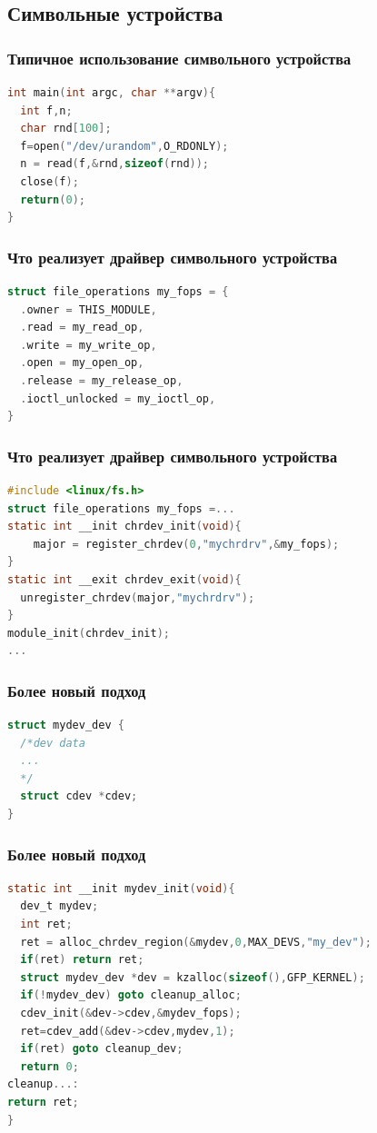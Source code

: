 \subsection{Символьные устройства}
\begin{frame}[fragile]
  \frametitle{Типичное использование символьного устройства}
\begin{lstlisting}[language=C]
int main(int argc, char **argv){
  int f,n;
  char rnd[100];
  f=open("/dev/urandom",O_RDONLY);
  n = read(f,&rnd,sizeof(rnd));
  close(f);
  return(0);
}
\end{lstlisting}
\end{frame}
\begin{frame}[fragile]
  \frametitle{Что реализует драйвер символьного устройства}
\begin{lstlisting}[language=C]
struct file_operations my_fops = {
  .owner = THIS_MODULE,
  .read = my_read_op,
  .write = my_write_op,
  .open = my_open_op,
  .release = my_release_op,
  .ioctl_unlocked = my_ioctl_op,
}
\end{lstlisting}
\end{frame}
\begin{frame}[fragile]
  \frametitle{Что реализует драйвер символьного устройства}
\begin{lstlisting}[language=C]
#include <linux/fs.h>
struct file_operations my_fops =...
static int __init chrdev_init(void){
    major = register_chrdev(0,"mychrdrv",&my_fops);
}
static int __exit chrdev_exit(void){
  unregister_chrdev(major,"mychrdrv");
}
module_init(chrdev_init);
...
\end{lstlisting}
\end{frame}

\begin{frame}[fragile]
  \frametitle{Более новый подход}
\begin{lstlisting}[language=C]
struct mydev_dev {
  /*dev data
  ...
  */
  struct cdev *cdev;
}
\end{lstlisting}
\end{frame}

\begin{frame}[fragile]
  \frametitle{Более новый подход}
\begin{lstlisting}[language=C]
static int __init mydev_init(void){
  dev_t mydev;
  int ret;
  ret = alloc_chrdev_region(&mydev,0,MAX_DEVS,"my_dev");
  if(ret) return ret;
  struct mydev_dev *dev = kzalloc(sizeof(),GFP_KERNEL);
  if(!mydev_dev) goto cleanup_alloc;
  cdev_init(&dev->cdev,&mydev_fops);
  ret=cdev_add(&dev->cdev,mydev,1);
  if(ret) goto cleanup_dev;
  return 0;
cleanup...:
return ret;
}
\end{lstlisting}
\end{frame}

